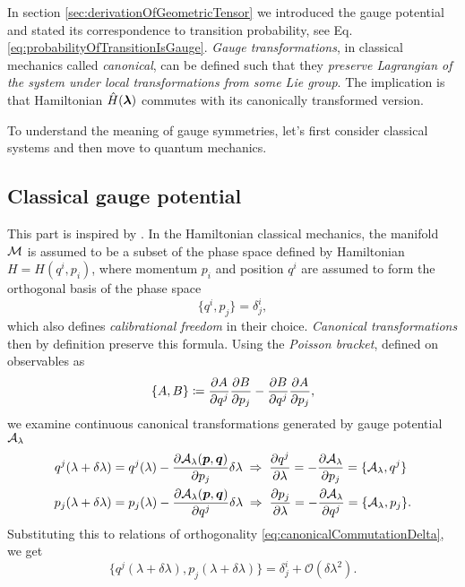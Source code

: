 In section \ref{sec:derivationOfGeometricTensor} we introduced the gauge potential and stated its correspondence to transition probability, see Eq. \ref{eq:probabilityOfTransitionIsGauge}.
\emph{Gauge transformations}, in classical mechanics called \emph{canonical}, can be defined such that they \emph{preserve Lagrangian of the system under local transformations from some Lie group}. The implication is that Hamiltonian $\hat{H}({\bm\lambda})$ commutes with its canonically transformed version.

To understand the meaning of gauge symmetries, let's first consider classical systems and then move to quantum mechanics.




\subsection{Classical gauge potential}
This part is inspired by \citet[Chap. 2.1]{kolodrubez}. In the Hamiltonian classical mechanics, the manifold $\mathcal{M}$ is assumed to be a subset of the phase space defined by Hamiltonian $H=H(q^i,p_i)$, where momentum $p_i$ and position $q^i$ are assumed to form the orthogonal basis of the phase space
\begin{equation}
    \{q^i,p_j\}=\delta^i_j,
    \label{eq:canonicalCommutationDelta}
\end{equation}
which also defines \emph{calibrational freedom} in their choice. \emph{Canonical transformations} then by definition preserve this formula. Using the \emph{Poisson bracket}, defined on observables as
\begin{equation}
    \{A,B\}\coloneqq \frac{\partial A}{\partial q^j}\frac{\partial B}{\partial p_j}-\frac{\partial B}{\partial q^j}\frac{\partial A}{\partial p_j},
\end{equation}
we examine continuous canonical transformations generated by gauge potential $\mathcal{A}_\lambda$
\begin{align}
        q^j(\lambda+\delta\lambda)&=q^j(\lambda)-\frac{\partial \mathcal{A}_\lambda(\bm{p},\bm{q})}{\partial p_j}\delta\lambda \;\Rightarrow\; \frac{\partial q^j}{\partial \lambda}=-\frac{\partial \mathcal{A}_\lambda}{\partial p_j}=\{\mathcal{A}_\lambda,q^j\}
        \label{eq:gaugeAsGeneratorOfMotion1}\\
        p_j(\lambda+\delta\lambda)&=p_j(\lambda)-\frac{\partial \mathcal{A}_\lambda(\bm{p},\bm{q})}{\partial q^j}\delta\lambda \;\Rightarrow\; \frac{\partial p_j}{\partial \lambda}=-\frac{\partial \mathcal{A}_\lambda}{\partial q^j}=\{\mathcal{A}_\lambda,p_j\}.
        \label{eq:gaugeAsGeneratorOfMotion2}
\end{align}
Substituting this to relations of orthogonality \ref{eq:canonicalCommutationDelta}, we get
\begin{equation}
    \{q^j(\lambda+\delta\lambda),p_j(\lambda+\delta\lambda)\}=\delta^i_j + \mathcal{O}(\delta\lambda^2).
\end{equation}
 
